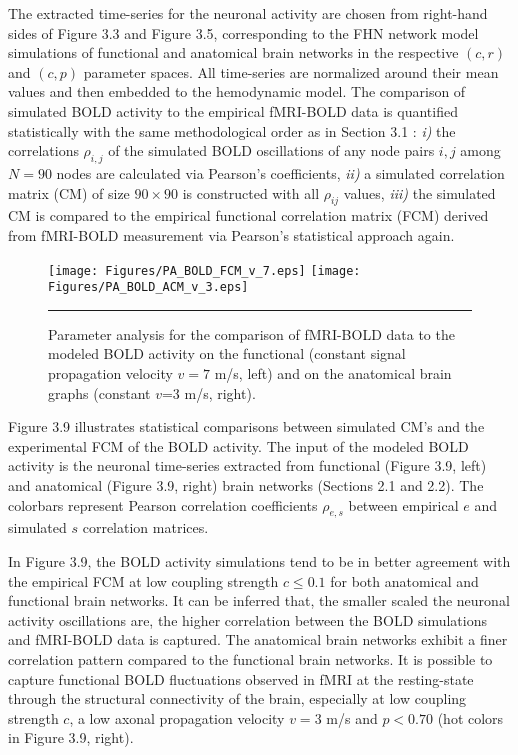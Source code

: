 The extracted time-series for the neuronal activity are chosen from right-hand sides of Figure 3.3 and Figure 3.5, corresponding to the FHN network model simulations of functional and anatomical brain networks in the respective $(c,r)$ and $(c,p)$ parameter spaces. All time-series are normalized around their mean values and then embedded to the hemodynamic model. The comparison of simulated BOLD activity to the empirical fMRI-BOLD data is quantified statistically with the same methodological order as in Section 3.1 : \textit{i)} the correlations $\rho_{i,j}$ of the simulated BOLD oscillations of any node pairs $i,j$ among $N=90$ nodes are calculated via Pearson's coefficients, \textit{ii)} a simulated correlation matrix (CM) of size $90 \times 90$ is constructed with all $\rho_{ij}$ values, \textit{iii)} the simulated CM is compared to the empirical functional correlation matrix (FCM) derived from fMRI-BOLD measurement via Pearson's statistical approach again.    


\begin{figure}[htbp]
 
  \centering
    \texttt{[image: Figures/PA\_BOLD\_FCM\_v\_7.eps]} 
	\texttt{[image: Figures/PA\_BOLD\_ACM\_v\_3.eps]} 

	
    \rule{35em}{0.5pt}
  \caption[Parameter Analysis, BOLD]{Parameter analysis for the comparison of fMRI-BOLD data to the modeled BOLD activity on the functional (constant signal propagation velocity $v=7$ m/s, left) and on the anatomical brain graphs (constant $v$=3 m/s, right). }
  \label{fig:Parameter Analysis, BOLD}
 	
\end{figure} 

Figure 3.9 illustrates statistical comparisons between simulated CM's and  the experimental FCM of the BOLD activity. The input of the modeled BOLD activity is the neuronal time-series extracted from functional (Figure 3.9, left) and anatomical (Figure 3.9, right) brain networks (Sections 2.1 and 2.2). The colorbars represent Pearson correlation coefficients $\rho_{e,s}$ between empirical $e$ and simulated $s$ correlation matrices. 

In Figure 3.9, the BOLD activity simulations tend to be in better agreement with the empirical FCM at low coupling strength $c \leq 0.1$ for both anatomical and functional brain networks. It can be inferred that, the smaller scaled the neuronal activity oscillations are, the higher correlation between the BOLD simulations and fMRI-BOLD data is captured. The anatomical brain networks exhibit a finer correlation pattern compared to the functional brain networks. It is possible to capture functional BOLD fluctuations observed in fMRI at the resting-state through the structural connectivity of the brain, especially at low coupling strength $c$, a low axonal propagation velocity $v=3$ m/s and $p<0.70$ (hot colors in Figure 3.9, right). 

